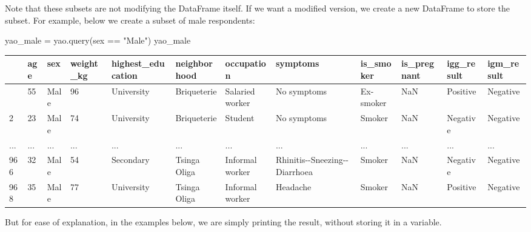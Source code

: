 \documentclass[
  letterpaper,
  DIV=11,
  numbers=noendperiod]{scrreprt}
\newenvironment{Shaded}{\begin{snugshade}}{\end{snugshade}}
\newcommand{\NormalTok}[1]{\textcolor[rgb]{0.00,0.23,0.31}{#1}}
\newcommand{\OperatorTok}[1]{\textcolor[rgb]{0.37,0.37,0.37}{#1}}
\newcommand{\StringTok}[1]{\textcolor[rgb]{0.13,0.47,0.30}{#1}}
\begin{document}
\begin{tcolorbox}[enhanced jigsaw, colframe=quarto-callout-note-color-frame, opacityback=0, titlerule=0mm, bottomrule=.15mm, breakable, leftrule=.75mm, colbacktitle=quarto-callout-note-color!10!white, title=\textcolor{quarto-callout-note-color}{\faInfo}\hspace{0.5em}{Key Point}, rightrule=.15mm, coltitle=black, opacitybacktitle=0.6, colback=white, left=2mm, arc=.35mm, toptitle=1mm, bottomtitle=1mm, toprule=.15mm]

Note that these subsets are not modifying the DataFrame itself. If we
want a modified version, we create a new DataFrame to store the subset.
For example, below we create a subset of male respondents:

\begin{Shaded}
\begin{Highlighting}[]
\NormalTok{yao\_male }\OperatorTok{=}\NormalTok{ yao.query(}\StringTok{\textquotesingle{}sex == "Male"\textquotesingle{}}\NormalTok{)}
\NormalTok{yao\_male}
\end{Highlighting}
\end{Shaded}

\begin{longtable}[]{@{}llllllllllll@{}}
\toprule\noalign{}
& age & sex & weight\_kg & highest\_education & neighborhood &
occupation & symptoms & is\_smoker & is\_pregnant & igg\_result &
igm\_result \\
\midrule\noalign{}
\endhead
\bottomrule\noalign{}
\endlastfoot
1 & 55 & Male & 96 & University & Briqueterie & Salaried worker & No
symptoms & Ex-smoker & NaN & Positive & Negative \\
2 & 23 & Male & 74 & University & Briqueterie & Student & No symptoms &
Smoker & NaN & Negative & Negative \\
... & ... & ... & ... & ... & ... & ... & ... & ... & ... & ... & ... \\
966 & 32 & Male & 54 & Secondary & Tsinga Oliga & Informal worker &
Rhinitis-\/-Sneezing-\/-Diarrhoea & Smoker & NaN & Negative &
Negative \\
968 & 35 & Male & 77 & University & Tsinga Oliga & Informal worker &
Headache & Smoker & NaN & Positive & Negative \\
\end{longtable}

But for ease of explanation, in the examples below, we are simply
printing the result, without storing it in a variable.

\end{tcolorbox}
\end{document}
